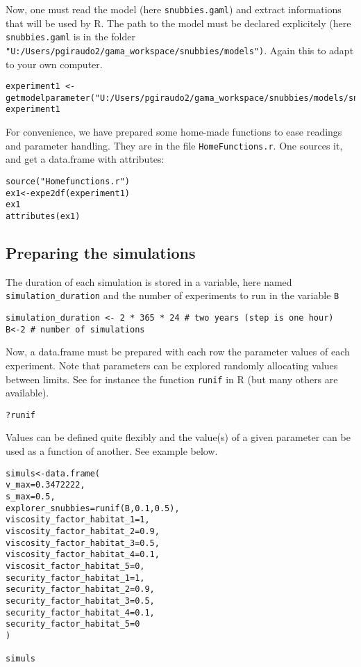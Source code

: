 Now, one must read the model (here \texttt{snubbies.gaml}) and extract informations that will be used by R. The path to the model must be declared explicitely (here \texttt{snubbies.gaml}  is in the folder \texttt{"U:/Users/pgiraudo2/gama\_workspace/snubbies/models")}. Again this to adapt to your own computer.

\begin{lstlisting}
experiment1 <- getmodelparameter("U:/Users/pgiraudo2/gama_workspace/snubbies/models/snubbies.gaml","run")
experiment1
\end{lstlisting}


For convenience, we have prepared some home-made functions to ease readings and parameter handling. They are in the file \texttt{HomeFunctions.r}. One sources it, and get a data.frame with attributes:

\label{lab:sourcefunction}
\begin{lstlisting}
source("Homefunctions.r")
ex1<-expe2df(experiment1)
ex1
attributes(ex1)
\end{lstlisting}

\subsection{Preparing the simulations}

The duration of each simulation is stored in a variable, here named \texttt{simulation\_duration} and the number of experiments to run in the variable \texttt{B}

\begin{lstlisting}
simulation_duration <- 2 * 365 * 24 # two years (step is one hour)
B<-2 # number of simulations
\end{lstlisting}

Now, a data.frame must be prepared with each row the parameter values of each experiment. Note that parameters can be explored randomly allocating values between limits. See for instance the function \texttt{runif} in R (but many others are available).

\begin{lstlisting}
?runif
\end{lstlisting}

Values can be defined quite flexibly and the value(s) of a given parameter can be used as a function of another. See example below.

\label{lab:simuls}
\begin{lstlisting}
simuls<-data.frame(
v_max=0.3472222,
s_max=0.5,
explorer_snubbies=runif(B,0.1,0.5),
viscosity_factor_habitat_1=1,
viscosity_factor_habitat_2=0.9,
viscosity_factor_habitat_3=0.5,
viscosity_factor_habitat_4=0.1,
viscosit_factor_habitat_5=0,
security_factor_habitat_1=1,
security_factor_habitat_2=0.9,
security_factor_habitat_3=0.5,
security_factor_habitat_4=0.1,
security_factor_habitat_5=0
)

simuls

\end{lstlisting}

